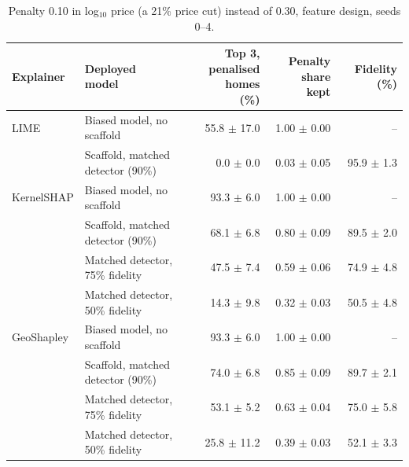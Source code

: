 \begin{table}[t]
\centering
\footnotesize
\setlength{\tabcolsep}{3.5pt}
\begin{adjustbox}{max width=\linewidth}
\begin{tabular}{llrrr}
\toprule
Explainer & \makecell[b]{Deployed \\ model} & \makecell[b]{Top 3, \\ penalised \\ homes (\%)} & \makecell[b]{Penalty share \\ kept} & Fidelity (\%) \\
\midrule
LIME & Biased model, no scaffold & 55.8 $\pm$ 17.0 & 1.00 $\pm$ 0.00 & -- \\
 & Scaffold, matched detector (90\%) & 0.0 $\pm$ 0.0 & 0.03 $\pm$ 0.05 & 95.9 $\pm$ 1.3 \\
\midrule
KernelSHAP & Biased model, no scaffold & 93.3 $\pm$ 6.0 & 1.00 $\pm$ 0.00 & -- \\
 & Scaffold, matched detector (90\%) & 68.1 $\pm$ 6.8 & 0.80 $\pm$ 0.09 & 89.5 $\pm$ 2.0 \\
 & Matched detector, 75\% fidelity & 47.5 $\pm$ 7.4 & 0.59 $\pm$ 0.06 & 74.9 $\pm$ 4.8 \\
 & Matched detector, 50\% fidelity & 14.3 $\pm$ 9.8 & 0.32 $\pm$ 0.03 & 50.5 $\pm$ 4.8 \\
\midrule
GeoShapley & Biased model, no scaffold & 93.3 $\pm$ 6.0 & 1.00 $\pm$ 0.00 & -- \\
 & Scaffold, matched detector (90\%) & 74.0 $\pm$ 6.8 & 0.85 $\pm$ 0.09 & 89.7 $\pm$ 2.1 \\
 & Matched detector, 75\% fidelity & 53.1 $\pm$ 5.2 & 0.63 $\pm$ 0.04 & 75.0 $\pm$ 5.8 \\
 & Matched detector, 50\% fidelity & 25.8 $\pm$ 11.2 & 0.39 $\pm$ 0.03 & 52.1 $\pm$ 3.3 \\
\bottomrule
\end{tabular}
\end{adjustbox}
\caption{Penalty 0.10 in log$_{10}$ price (a 21\% price cut) instead of 0.30, feature design, seeds 0--4.}
\label{tab:penalty010}
\end{table}
